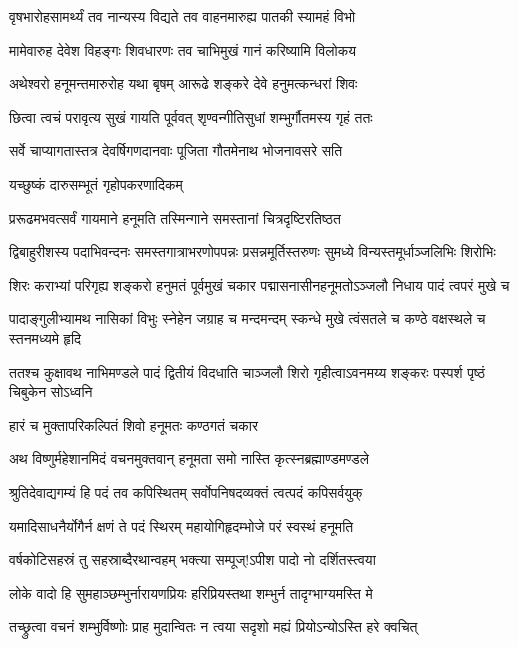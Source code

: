 \twolineshloka
{वृषभारोहसामर्थ्यं तव नान्यस्य विद्यते}
{तव वाहनमारुह्य पातकी स्यामहं विभो}%

\twolineshloka
{मामेवारुह देवेश विहङ्गः शिवधारणः}
{तव चाभिमुखं गानं करिष्यामि विलोकय}%

\twolineshloka
{अथेश्वरो हनूमन्तमारुरोह यथा बृषम्}
{आरूढे शङ्करे देवे हनुमत्कन्धरां शिवः}%

\twolineshloka
{छित्वा त्वचं परावृत्य सुखं गायति पूर्ववत्}
{शृण्वन्गीतिसुधां शम्भुर्गौतमस्य गृहं ततः}%

\twolineshloka
{सर्वे चाप्यागतास्तत्र देवर्षिगणदानवाः}
{पूजिता गौतमेनाथ भोजनावसरे सति}%

\twolineshloka
{यच्छुष्कं दारुसम्भूतं गृहोपकरणादिकम्}

\twolineshloka
{प्ररूढमभवत्सर्वं गायमाने हनूमति}%
{तस्मिन्गाने समस्तानां चित्रदृष्टिरतिष्ठत}%

\twolineshloka
{द्विबाहुरीशस्य पदाभिवन्दनः समस्तगात्राभरणोपपन्नः}
{प्रसन्नमूर्तिस्तरुणः सुमध्ये विन्यस्तमूर्धाञ्जलिभिः शिरोभिः}%

\twolineshloka
{शिरः कराभ्यां परिगृह्य शङ्करो हनुमतं पूर्वमुखं चकार}
{पद्मासनासीनहनूमतोऽञ्जलौ निधाय पादं त्वपरं मुखे च}%

\twolineshloka
{पादाङ्गुलीभ्यामथ नासिकां विभुः स्नेहेन जग्राह च मन्दमन्दम्}
{स्कन्धे मुखे त्वंसतले च कण्ठे वक्षस्थले च स्तनमध्यमे हृदि}%

\twolineshloka
{ततश्च कुक्षावथ नाभिमण्डले पादं द्वितीयं विदधाति चाञ्जलौ}
{शिरो गृहीत्वाऽवनमय्य शङ्करः पस्पर्श पृष्ठं चिबुकेन सोऽध्वनि}%

\onelineshloka
{हारं च मुक्तापरिकल्पितं शिवो हनूमतः कण्ठगतं चकार}%

\twolineshloka
{अथ विष्णुर्महेशानमिदं वचनमुक्तवान्}
{हनूमता समो नास्ति कृत्स्नब्रह्माण्डमण्डले}%

\twolineshloka
{श्रुतिदेवाद्यगम्यं हि पदं तव कपिस्थितम्}
{सर्वोपनिषदव्यक्तं त्वत्पदं कपिसर्वयुक्}%

\twolineshloka
{यमादिसाधनैर्योगैर्न क्षणं ते पदं स्थिरम्}
{महायोगिहृदम्भोजे परं स्वस्थं हनूमति}%

\twolineshloka
{वर्षकोटिसहस्रं तु सहस्राब्दैरथान्वहम्}
{भक्त्या सम्पूज्!ऽपीश पादो नो दर्शितस्त्वया}%

\twolineshloka
{लोके वादो हि सुमहाञ्छम्भुर्नारायणप्रियः}
{हरिप्रियस्तथा शम्भुर्न तादृग्भाग्यमस्ति मे}%

\twolineshloka
{तच्छ्रुत्वा वचनं शम्भुर्विष्णोः प्राह मुदान्वितः}
{न त्वया सदृशो मह्यं प्रियोऽन्योऽस्ति हरे क्वचित्}%

